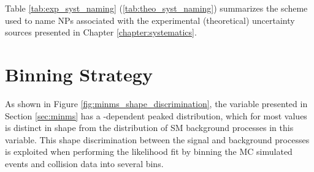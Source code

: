 Table \ref{tab:exp_syst_naming} (\ref{tab:theo_syst_naming}) summarizes the scheme used to name NPs associated with the experimental (theoretical) uncertainty sources presented in Chapter \ref{chapter:systematics}.

\section{Binning Strategy}
\label{sec:binning_strategy}

As shown in Figure \ref{fig:minms_shape_discrimination}, the \minms variable presented in Section \ref{sec:minms} has a \ms-dependent peaked distribution, which for most \ms values is distinct in shape from the distribution of SM background processes in this variable. This shape discrimination between the signal and background processes is exploited when performing the likelihood fit by binning the MC simulated events and collision data into several \minms bins. 

